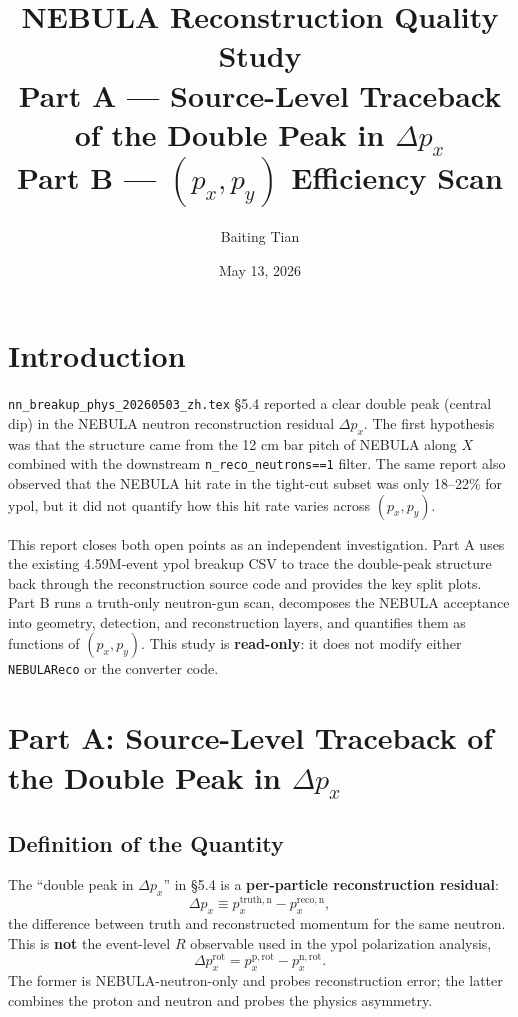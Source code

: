 \documentclass[a4paper,11pt]{article}
\title{\textbf{NEBULA Reconstruction Quality Study}\\
       Part A --- Source-Level Traceback of the Double Peak in $\Delta p_x$\\
       Part B --- $(p_x,p_y)$ Efficiency Scan}
\author{Baiting Tian}
\date{May 13, 2026}
\begin{document}
\maketitle
\tableofcontents

\section{Introduction}

\texttt{nn\_breakup\_phys\_20260503\_zh.tex} \S5.4 reported a clear double peak
(central dip) in the NEBULA neutron reconstruction residual $\Delta p_x$. The
first hypothesis was that the structure came from the 12 cm bar pitch of NEBULA
along $X$ combined with the downstream \texttt{n\_reco\_neutrons==1} filter. The
same report also observed that the NEBULA hit rate in the tight-cut subset was
only 18--22\% for ypol, but it did not quantify how this hit rate varies across
$(p_x,p_y)$.

This report closes both open points as an independent investigation. Part A uses
the existing 4.59M-event ypol breakup CSV to trace the double-peak structure back
through the reconstruction source code and provides the key split plots. Part B
runs a truth-only neutron-gun scan, decomposes the NEBULA acceptance into geometry,
detection, and reconstruction layers, and quantifies them as functions of
$(p_x,p_y)$. This study is \textbf{read-only}: it does not modify either
\texttt{NEBULAReco} or the converter code.

\section{Part A: Source-Level Traceback of the Double Peak in $\Delta p_x$}

\subsection{Definition of the Quantity}

The ``double peak in $\Delta p_x$'' in \S5.4 is a \textbf{per-particle
reconstruction residual}:
\[
    \Delta p_x \equiv p_x^{\mathrm{truth,n}} - p_x^{\mathrm{reco,n}},
\]
the difference between truth and reconstructed momentum for the same neutron.
This is \textbf{not} the event-level $R$ observable used in the ypol polarization
analysis,
\[
    \Delta p_x^{\mathrm{rot}} =
    p_x^{\mathrm{p,rot}} - p_x^{\mathrm{n,rot}}.
\]
The former is NEBULA-neutron-only and probes reconstruction error; the latter
combines the proton and neutron and probes the physics asymmetry.
\end{document}
